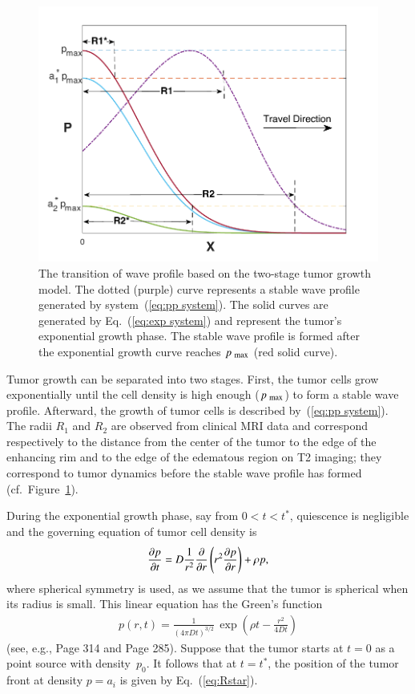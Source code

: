 \documentclass{aims}
\numberwithin{equation}{section}
\begin{document}
\begin{figure}
\begin{center}
\includegraphics[scale=0.90]{plots/wave-edited.pdf}
\end{center}
\caption{The transition of wave profile based on the two-stage tumor growth model. The
dotted (purple) curve represents a stable wave profile generated by
system~(\ref{eq:pp system}). The solid curves are generated by Eq.~(\ref{eq:exp system})
and represent the tumor's exponential growth phase.
The stable wave profile is formed after the exponential growth curve reaches
$p_{\mbox{\scriptsize max}}$ (red solid curve).}
\label{fig:wave}
\end{figure}

Tumor growth can be separated into two stages. First, the tumor cells grow exponentially
until the cell density is high enough ($p_{\mbox{\scriptsize max}}$) to form 
a stable wave profile. Afterward, the growth of tumor cells is described
by~(\ref{eq:pp system}).
The radii $R_1$ and $R_2$ are observed from clinical MRI data and correspond respectively
to the
distance from the center of the tumor to the edge of the enhancing rim and to the edge
of the edematous region on T2 imaging; they correspond to tumor dynamics
before the stable wave profile has formed (cf.\ Figure~\ref{fig:wave}). 

During the exponential growth phase, say from $0<t<t^*$, quiescence is negligible and the governing equation of tumor cell density is 
\begin{eqnarray}\label{eq:exp system}
\frac{\partial p}{\partial t} =  D\frac{1}{r^2} \frac{\partial}{\partial r} \left(r^2 \frac{\partial p}{\partial r}\right) + \rho p,
\end{eqnarray}
where spherical symmetry is used, as we assume that the tumor is spherical when
its radius is small.
This linear equation has the Green's function 
\begin{eqnarray}
p(r,t)=\frac{1}{(4 \pi D t)^{3/2}}\, \exp\left(\rho t - \frac{r^2}{4Dt}\right) 
\end{eqnarray}
(see, e.g., \cite{KotBook} Page 314 and \cite{BrittonBook} Page 285).
Suppose that the tumor starts at $t=0$ as a point source with density~$p_0$.
It follows that at $t=t^*$, the position of the tumor front at density $p=a_i$  is 
given by Eq.~(\ref{eq:Rstar}). 




\end{document}
